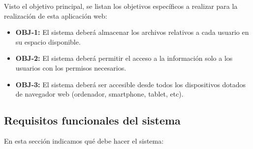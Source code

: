 Visto el objetivo principal, se listan los objetivos específicos a realizar para la realización de esta aplicación web:
\begin{itemize}
	\item \textbf{OBJ-1:} El sistema deberá almacenar los archivos relativos a cada usuario en su espacio disponible.
	\item \textbf{OBJ-2:} El sistema deberá permitir el acceso a la información solo a los usuarios con los permisos necesarios.
	\item \textbf{OBJ-3:} El sistema deberá ser accesible desde todos los dispositivos dotados de navegador web (ordenador, smartphone, tablet, etc).
\end{itemize}

\subsection{Requisitos funcionales del sistema}
En esta sección indicamos qué debe hacer el sistema:


